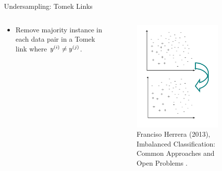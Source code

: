 \documentclass[11pt,compress,t,notes=noshow, xcolor=table]{beamer}
\begin{document}
\begin{frame}{Undersampling: Tomek Links}
{\begin{columns}
\begin{column}{0.7\textwidth}
\begin{itemize}
                \item Remove majority instance in each data pair in a Tomek link where $\yi \neq \yi[j]$.

                
                \end{itemize}		
            \end{column}
        
            \begin{column}{0.3\textwidth}
                \begin{figure}
                    \centering
                    \includegraphics[width=0.85\textwidth]{figure/tomek_link_plot.png}	
                    \tiny
                    \\ Franciso Herrera (2013), Imbalanced Classification: Common
                    Approaches and Open Problems .
                \end{figure}
            \end{column}
        \end{columns}
   }
\end{frame}
\end{document}
